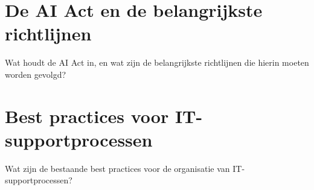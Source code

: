 \section{De AI Act en de belangrijkste richtlijnen}
Wat houdt de AI Act in, en wat zijn de belangrijkste richtlijnen die hierin moeten worden gevolgd?

\section{Best practices voor IT-supportprocessen}
Wat zijn de bestaande best practices voor de organisatie van IT-supportprocessen?
